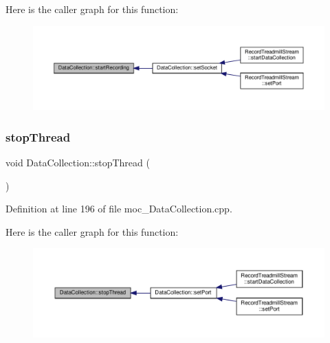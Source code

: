 Here is the caller graph for this function\+:
\nopagebreak
\begin{figure}[H]
\begin{center}
\leavevmode
\includegraphics[width=350pt]{class_data_collection_ae8d0c9f26d1ea90c725d5de873773da1_icgraph}
\end{center}
\end{figure}
\mbox{\label{class_data_collection_a9240f5699ec71869a9dd8354e6d2eb9d}} 
\subsubsection{\texorpdfstring{stop\+Thread}{stopThread}}
{\footnotesize\ttfamily void Data\+Collection\+::stop\+Thread (\begin{DoxyParamCaption}{ }\end{DoxyParamCaption})\hspace{0.3cm}{\ttfamily [signal]}}



Definition at line 196 of file moc\+\_\+\+Data\+Collection.\+cpp.

Here is the caller graph for this function\+:
\nopagebreak
\begin{figure}[H]
\begin{center}
\leavevmode
\includegraphics[width=350pt]{class_data_collection_a9240f5699ec71869a9dd8354e6d2eb9d_icgraph}
\end{center}
\end{figure}
\mbox{\label{class_data_collection_ab4f3954209cf3fb115ae074bff3f6977}} 
